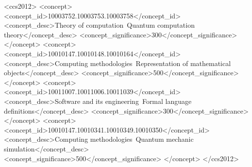 \documentclass[sigconf,natbib=false]{acmart}
\begin{document}


\begin{CCSXML}
<ccs2012>
<concept>
<concept_id>10003752.10003753.10003758</concept_id>
<concept_desc>Theory of computation~Quantum computation theory</concept_desc>
<concept_significance>300</concept_significance>
</concept>
<concept>
<concept_id>10010147.10010148.10010164</concept_id>
<concept_desc>Computing methodologies~Representation of mathematical objects</concept_desc>
<concept_significance>500</concept_significance>
</concept>
<concept>
<concept_id>10011007.10011006.10011039</concept_id>
<concept_desc>Software and its engineering~Formal language definitions</concept_desc>
<concept_significance>300</concept_significance>
</concept>
<concept>
<concept_id>10010147.10010341.10010349.10010350</concept_id>
<concept_desc>Computing methodologies~Quantum mechanic simulation</concept_desc>
<concept_significance>500</concept_significance>
</concept>
</ccs2012>
\end{CCSXML}


\end{document}
